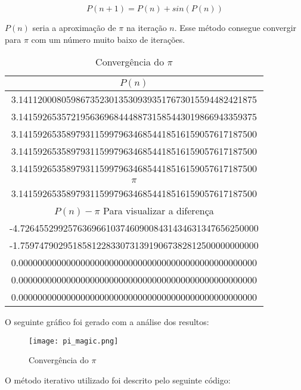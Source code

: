 \begin{equation}
\label{magic_equation}
P(n+1) = P(n) + sin(P(n))
\end{equation}

$P(n)$ seria a aproximação de $\pi$ na iteração $n$. Esse método consegue
convergir para $\pi$ com um número muito baixo de iterações.

\begin{table}[H]
	\centering
	\begin{tabular}{|c|}
    	\hline
		$P(n)$ \\
		\hline
		3.14112000805986735230135309393517673015594482421875 \\
		\hline
		3.14159265357219563696844488731585443019866943359375 \\
		\hline
		3.14159265358979311599796346854418516159057617187500 \\
		\hline
		3.14159265358979311599796346854418516159057617187500 \\
		\hline
		3.14159265358979311599796346854418516159057617187500 \\
		\hline
		\hline
		$\pi$ \\
		\hline
		3.14159265358979311599796346854418516159057617187500 \\
		\hline
		\hline
		$P(n) - \pi$  Para visualizar a diferença \\
		\hline
		-4.72645529925763696610374609008431434631347656250000 \\
		\hline
		-1.75974790295185812283307313919067382812500000000000 \\
		\hline
		0.00000000000000000000000000000000000000000000000000 \\
		\hline
		0.00000000000000000000000000000000000000000000000000 \\
		\hline
		0.00000000000000000000000000000000000000000000000000 \\
		\hline
	\end{tabular}
	\label{pi_magic}
	\caption{Convergência do $\pi$}
\end{table}

O seguinte gráfico foi gerado com a análise dos resultos:

\begin{figure}[H]
    \centering
    \texttt{[image: pi\_magic.png]}
    \caption{Convergência do $\pi$}
    \label{fig:pi-magic}
\end{figure}

O método iterativo utilizado foi descrito pelo seguinte código:

